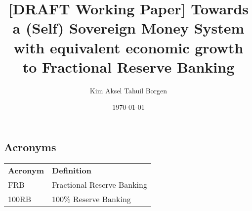 \documentclass{article}
\title{[DRAFT Working Paper] Towards a (Self) Sovereign Money System with equivalent economic growth to Fractional Reserve Banking}
\author{Kim Aksel Tahuil Borgen}
\date{\today}
\begin{document}
\maketitle

\begin{abstract}
        
\end{abstract}
\subsection{Acronyms}

\begin{tabular}{ll}
\textbf{Acronym} & \textbf{Definition} \\
FRB & Fractional Reserve Banking \\
100RB & 100\% Reserve Banking \\
\end{tabular}





\printbibliography
\end{document}
